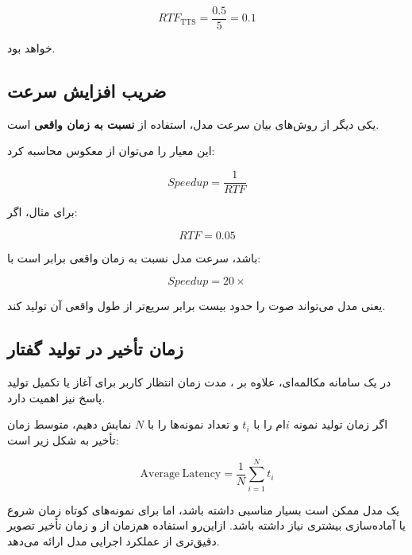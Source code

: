 \begin{equation}
RTF_{\mathrm{TTS}}
=
\frac{0.5}{5}
=
0.1
\end{equation}

خواهد بود.


\subsection{ضریب افزایش سرعت}

یکی دیگر از روش‌های بیان سرعت مدل، استفاده از
\textbf{ نسبت به زمان واقعی}
است.

این معیار را می‌توان از معکوس  محاسبه کرد:

\begin{equation}
Speedup
=
\frac{1}{RTF}
\end{equation}

برای مثال، اگر:

\begin{equation}
RTF = 0.05
\end{equation}

باشد، سرعت مدل نسبت به زمان واقعی برابر است با:

\begin{equation}
Speedup
=
20\times
\end{equation}

یعنی مدل می‌تواند صوت را حدود بیست برابر سریع‌تر از طول واقعی
آن تولید کند.


\subsection{زمان تأخیر در تولید گفتار}

در یک سامانه مکالمه‌ای، علاوه بر ، مدت زمان انتظار
کاربر برای آغاز یا تکمیل تولید پاسخ نیز اهمیت دارد.

اگر زمان تولید نمونه $i$ام را با $t_i$ و تعداد نمونه‌ها را با
$N$ نمایش دهیم، متوسط زمان تأخیر به شکل زیر است:

\begin{equation}
\mathrm{Average\ Latency}
=
\frac{1}{N}
\sum_{i=1}^{N} t_i
\end{equation}

یک مدل ممکن است  بسیار مناسبی داشته باشد، اما برای
نمونه‌های کوتاه زمان شروع یا آماده‌سازی بیشتری نیاز داشته باشد.
ازاین‌رو استفاده هم‌زمان از  و زمان تأخیر تصویر دقیق‌تری
از عملکرد اجرایی مدل ارائه می‌دهد.



